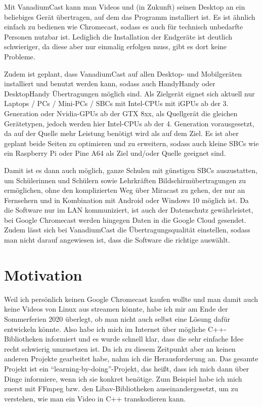\documentclass{article}
\begin{document}
    Mit VanadiumCast kann man Videos und (in Zukunft) seinen Desktop an ein
    beliebiges Gerät übertragen, auf dem das Programm installiert ist. Es
    ist ähnlich einfach zu bedienen wie Chromecast, sodass es auch für
    technisch unbedarfte Personen nutzbar ist. Lediglich die Installation
    der Endgeräte ist deutlich schwieriger, da diese aber nur einmalig
    erfolgen muss, gibt es dort keine Probleme.

    Zudem ist geplant, dass VanadiumCast auf allen Desktop- und Mobilgeräten
    installiert und benutzt werden kann, sodass auch Handy\textrightarrow Handy oder
    Desktop\textrightarrow Handy Übertragungen möglich sind. Als Zielgerät eignet sich
    aktuell nur Laptops / PCs / Mini-PCs / SBCs mit Intel-CPUs mit iGPUs ab
    der 3. Generation oder Nvidia-GPUs ab der GTX 8xx, als Quellgerät die
    gleichen Gerätetypen, jedoch werden hier Intel-CPUs ab der 4. Generation
    vorausgesetzt, da auf der Quelle mehr Leistung benötigt wird als auf dem
    Ziel. Es ist aber geplant beide Seiten zu optimieren und zu erweitern,
    sodass auch kleine SBCs wie ein Raspberry Pi oder Pine A64 als Ziel
    und/oder Quelle geeignet sind.

    Damit ist es dann auch möglich, ganze Schulen mit günstigen SBCs
    auszustatten, um Schülerinnen und Schülern sowie Lehrkräften
    Bildschirmübertragungen zu ermöglichen, ohne den komplizierten Weg über
    Miracast zu gehen, der nur an Fernsehern und in Kombination mit Android
    oder Windows 10 möglich ist. Da die Software nur im LAN kommuniziert,
    ist auch der Datenschutz gewährleistet, bei Google Chromecast werden
    hingegen Daten in die Google Cloud gesendet. Zudem lässt sich bei
    VanadiumCast die Übertragungsqualität einstellen, sodass man nicht
    darauf angewiesen ist, dass die Software die richtige auswählt.


    \section{Motivation}\label{sec:motivation}

    Weil ich persönlich keinen Google Chromecast kaufen wollte und man damit
    auch keine Videos von Linux aus streamen könnte, habe ich mir am Ende
    der Sommerferien 2020 überlegt, ob man nicht auch selbst eine Lösung
    dafür entwickeln könnte. Also habe ich mich im Internet über mögliche
    C++-Bibliotheken informiert und es wurde schnell klar, dass die sehr
    einfache Idee recht schwierig umzusetzen ist. Da ich zu diesem Zeitpunkt
    aber an keinen anderen Projekte gearbeitet habe, nahm ich die
    Herausforderung an. Das gesamte Projekt ist ein
    ``learning-by-doing''-Projekt, das heißt, dass ich mich dann über Dinge
    informiere, wenn ich sie konkret benötige. Zum Beispiel habe ich mich
    zuerst mit FFmpeg bzw. den Libav-Bibliotheken auseinandergesetzt, um zu
    verstehen, wie man ein Video in C++ transkodieren kann.
\end{document}
